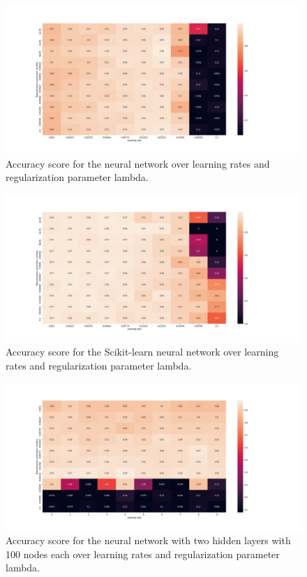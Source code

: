 \documentclass[reprint,english,notitlepage]{revtex4-2}  %
\begin{document}
\begin{figure}[!ht]
	\includegraphics[trim=250 0 0 0, scale=0.2]{Partd-3}
	\caption{Accuracy score for the neural network over learning rates and regularization parameter lambda.}\label{figure}	
\end{figure}
\begin{figure}[!ht]
	\includegraphics[trim=250 0 0 0, scale=0.2]{Partd-4}
	\caption{Accuracy score for the Scikit-learn neural network over learning rates and regularization parameter lambda. }\label{figure}	
\end{figure}
\begin{figure}[!ht]
	\includegraphics[trim=250 0 0 0, scale=0.2]{Partd-5}
	\caption{Accuracy score for the neural network with two hidden layers with 100 nodes each over learning rates and regularization parameter lambda. }\label{figure}	
\end{figure}
\end{document}
